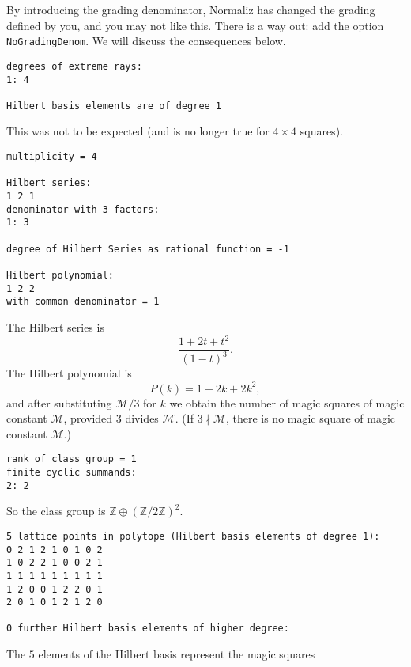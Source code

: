 \documentclass[12pt,a4paper]{scrartcl}
\theoremstyle{definition}
\def\ZZ{{\mathbb Z}}
\begin{document}
By introducing the grading denominator, Normaliz has changed the grading defined by you,
and you may not like this. There is a way out: add the option \verb|NoGradingDenom|. We will discuss the consequences below.
\begin{Verbatim}
degrees of extreme rays:
1: 4  

Hilbert basis elements are of degree 1
\end{Verbatim}
This was not to be expected (and is no longer true for $4\times 4$ squares).
\begin{Verbatim}
multiplicity = 4

Hilbert series:
1 2 1 
denominator with 3 factors:
1: 3  

degree of Hilbert Series as rational function = -1

Hilbert polynomial:
1 2 2 
with common denominator = 1
\end{Verbatim}
The Hilbert series is
$$
\frac{1+2t+t^2}{(1-t)^3}.
$$
The Hilbert polynomial is
$$
P(k)=1+2k+2k^2,
$$
and after substituting $\mathcal M/3$ for $k$ we obtain the
number of magic squares of magic constant $\mathcal M$, provided $3$ divides $\mathcal M$. (If $3\nmid \mathcal M$, there is no magic square of magic constant $\mathcal M$.)
\begin{Verbatim}
rank of class group = 1
finite cyclic summands:
2: 2  
\end{Verbatim}
So the class group is $\ZZ\oplus (\ZZ/2\ZZ)^2$.
\begin{Verbatim}
5 lattice points in polytope (Hilbert basis elements of degree 1):
0 2 1 2 1 0 1 0 2
1 0 2 2 1 0 0 2 1
1 1 1 1 1 1 1 1 1
1 2 0 0 1 2 2 0 1
2 0 1 0 1 2 1 2 0

0 further Hilbert basis elements of higher degree:
\end{Verbatim}
The $5$ elements of the Hilbert basis represent the magic
squares
\end{document}
